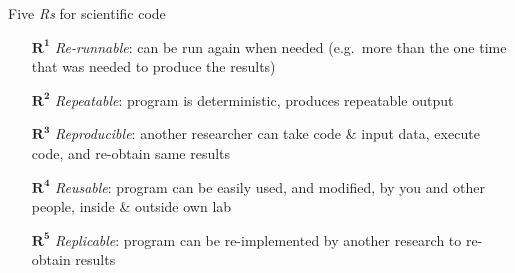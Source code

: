 

\begin{frame}{Five \textit{Rs} for scientific code}

  
  \begin{itemize}[leftmargin=2.6cm]
    \itemsep11pt
    \item[$\mathbf{R^1}$ \textit{Re-runnable}:] can be run again when needed (e.g.~more than the one time that was needed to produce the results)

    \item[$\mathbf{R^2}$ \textit{Repeatable}:] program is deterministic, produces repeatable output

    \item[$\mathbf{R^3}$ \textit{Reproducible}:] another researcher can take code \& input data, execute code, and re-obtain same results

    \item[$\mathbf{R^4}$ \textit{Reusable}:] program  can be easily used, and
modified, by you and other people, inside \& outside own lab

    \item[$\mathbf{R^5}$ \textit{Replicable}:] program can be re-implemented by another research to re-obtain results

  \end{itemize}  

  
  
  
\end{frame}


